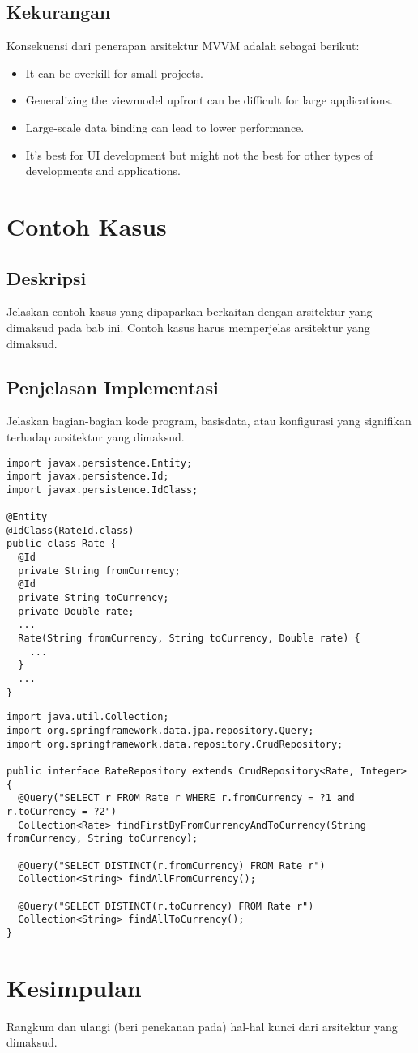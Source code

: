 \subsection{Kekurangan}
Konsekuensi dari penerapan arsitektur MVVM adalah sebagai berikut:
\begin{itemize}
\item It can be overkill for small projects. 
\item Generalizing the viewmodel upfront can be difficult for large applications.
\item Large-scale data binding can lead to lower performance.
\item It's best for UI development but might not the best for other types of developments and  applications.
\end{itemize}

\section{Contoh Kasus}

\subsection{Deskripsi}
Jelaskan contoh kasus yang dipaparkan berkaitan dengan arsitektur yang dimaksud pada bab ini.
Contoh kasus harus memperjelas arsitektur yang dimaksud.

\subsection{Penjelasan Implementasi}
Jelaskan bagian-bagian kode program, basisdata, atau konfigurasi yang signifikan terhadap arsitektur yang dimaksud.

\begin{lstlisting}[firstnumber=1,style=java,caption={Model dari \textsf{Rate}.},label=lst:rate_model]
import javax.persistence.Entity;
import javax.persistence.Id;
import javax.persistence.IdClass;

@Entity
@IdClass(RateId.class)
public class Rate {
  @Id
  private String fromCurrency;
  @Id
  private String toCurrency;
  private Double rate;
  ...
  Rate(String fromCurrency, String toCurrency, Double rate) {
    ...
  }
  ...
}
\end{lstlisting}

\begin{lstlisting}[firstnumber=1,style=java,caption={ \textsf{RateRepository}.},label=lst:rate_repository]
import java.util.Collection;
import org.springframework.data.jpa.repository.Query;
import org.springframework.data.repository.CrudRepository;

public interface RateRepository extends CrudRepository<Rate, Integer> {  
  @Query("SELECT r FROM Rate r WHERE r.fromCurrency = ?1 and r.toCurrency = ?2")
  Collection<Rate> findFirstByFromCurrencyAndToCurrency(String fromCurrency, String toCurrency);
  
  @Query("SELECT DISTINCT(r.fromCurrency) FROM Rate r")
  Collection<String> findAllFromCurrency();
  
  @Query("SELECT DISTINCT(r.toCurrency) FROM Rate r")
  Collection<String> findAllToCurrency(); 
}
\end{lstlisting}


\section{Kesimpulan}
Rangkum dan ulangi (beri penekanan pada) hal-hal kunci dari arsitektur yang dimaksud.